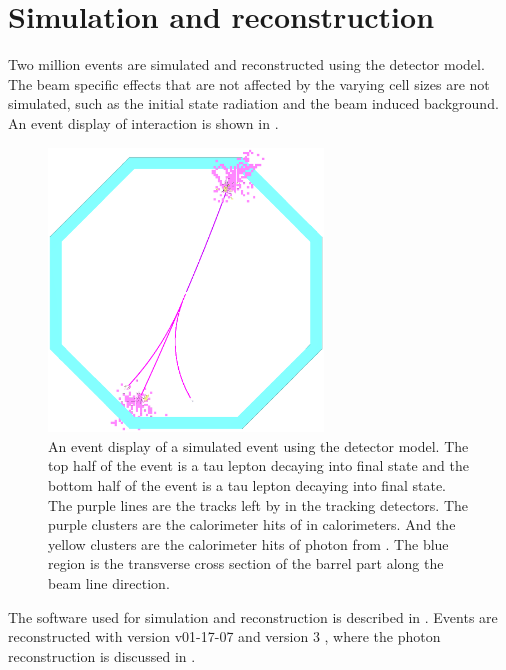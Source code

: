 \section{Simulation and reconstruction}
\label{sec:tauSim}


Two million \eeToTauTau events are simulated and reconstructed using the \ILD detector model. The beam specific effects that are not affected by the varying \ECAL cell sizes are not simulated, such as the initial state radiation and the beam induced background. An event display of \eeToTauTau interaction is shown in .



\begin{figure}[tbph]
\centering
\includegraphics[width=0.65\textwidth]{tau/tau_evt_dsp2}
\caption{ An event display of a simulated \eeToTauTau event using the \ILD detector model. The top half of the event is a tau lepton decaying into \decayRhoFinalState final state and the bottom half of the event is a tau lepton decaying into  \decayThreePionPhoton final state. The purple lines are the tracks left by \Ppipm in the tracking detectors. The purple clusters are the calorimeter hits of \Ppipm in calorimeters. And the yellow clusters are the calorimeter hits of photon from \HepProcess{\Ppizero \to \Pphoton \Pphoton}. The blue region is the transverse cross section of the \ECAL barrel part along the beam line direction.}
\label{fig:tauEvtDsp}
\end{figure}



The software used for simulation and reconstruction is described in . Events are reconstructed with  \ilcsoft version v01-17-07 \cite{Gaede:82475} and \pandora version 3 \cite{Marshall:2015rfa}, where the photon reconstruction is discussed in .


